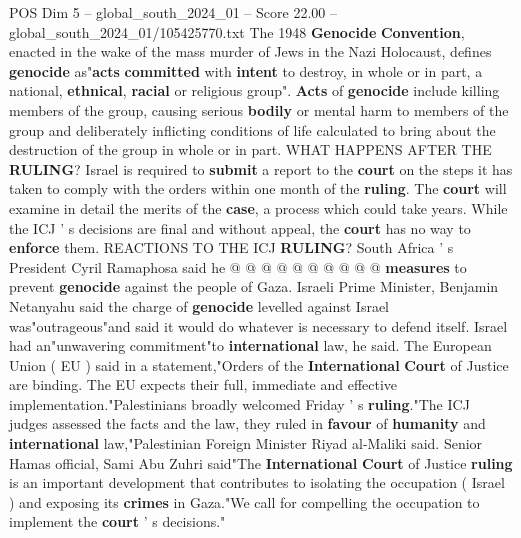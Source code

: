 \begin{textsample}{POS Dim 5 – global\_south\_2024\_01 – Score 22.00 – global\_south\_2024\_01/105425770.txt}
The 1948 \textbf{Genocide} \textbf{Convention}, enacted in the wake of the mass murder of Jews in the Nazi Holocaust, defines \textbf{genocide} as"\textbf{acts} \textbf{committed} with \textbf{intent} to destroy, in whole or in part, a national, \textbf{ethnical}, \textbf{racial} or religious group". \textbf{Acts} of \textbf{genocide} include killing members of the group, causing serious \textbf{bodily} or mental harm to members of the group and deliberately inflicting conditions of life calculated to bring about the destruction of the group in whole or in part.
WHAT HAPPENS AFTER THE \textbf{RULING}?
Israel is required to \textbf{submit} a report to the \textbf{court} on the steps it has taken to comply with the orders within one month of the \textbf{ruling}.
The \textbf{court} will examine in detail the merits of the \textbf{case}, a process which could take years.
While the ICJ ' s decisions are final and without appeal, the \textbf{court} has no way to \textbf{enforce} them.
REACTIONS TO THE ICJ \textbf{RULING}?
South Africa ' s President Cyril Ramaphosa said he @ @ @ @ @ @ @ @ @ @ \textbf{measures} to prevent \textbf{genocide} against the people of Gaza.
Israeli Prime Minister, Benjamin Netanyahu said the charge of \textbf{genocide} levelled against Israel was"outrageous"and said it would do whatever is necessary to defend itself.
Israel had an"unwavering commitment"to \textbf{international} law, he said.
The European Union ( EU ) said in a statement,"Orders of the \textbf{International} \textbf{Court} of Justice are binding.
The EU expects their full, immediate and effective implementation."Palestinians broadly welcomed Friday ' s \textbf{ruling}."The ICJ judges assessed the facts and the law, they ruled in \textbf{favour} of \textbf{humanity} and \textbf{international} law,"Palestinian Foreign Minister Riyad al-Maliki said.
Senior Hamas official, Sami Abu Zuhri said"The \textbf{International} \textbf{Court} of Justice \textbf{ruling} is an important development that contributes to isolating the occupation ( Israel ) and exposing its \textbf{crimes} in Gaza."We call for compelling the occupation to implement the \textbf{court} ' s decisions."

\end{textsample}
